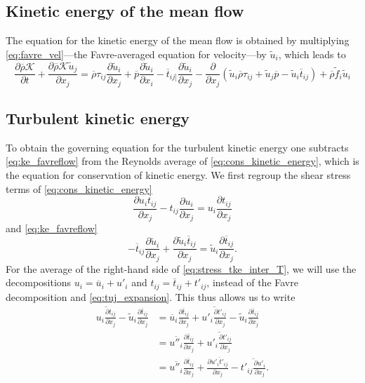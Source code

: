 \documentclass[oneside,a4paper,11pt]{report}
\newcommand{\rhoavg}{\overline{\rho}}
\newcommand{\pavg}{\overline{p}}
\newcommand{\tavg}{\overline{t}}
\newcommand{\uavg}{\overline{u}}
\newcommand{\tfluc}{t'}
\newcommand{\ufluc}{u'}
\newcommand{\rs}{\tau}          %
\newcommand{\favgf}{\widetilde{f}}
\newcommand{\uavgf}{\widetilde{u}}
\newcommand{\uflucf}{u''}
\begin{document}
\subsection{Kinetic energy of the mean flow}
The equation for the kinetic energy of the mean flow is obtained by multiplying \cref{eq:favre_vel}---the Favre-averaged equation for velocity---by $\uavgf_i$, which leads to
\begin{equation}
\label{eq:ke_favreflow}
\frac{ \partial \rhoavg \mathcal{K} }{ \partial t} + \frac{ \partial \rhoavg \mathcal{K} \uavgf_j }{ \partial x_j} = \rhoavg \rs_{ij} \frac{ \partial \uavgf_i }{ \partial x_j } + \pavg \frac{ \partial \uavgf_i }{ \partial x_i } - \tavg_{ij]} \frac{ \partial \uavgf_i }{ \partial x_j } - \frac{\partial}{\partial x_j} \left ( \uavgf_i \rhoavg \rs_{ij} + \uavgf_j \pavg - \uavgf_i \tavg_{ij} \right ) + \rhoavg \favgf_i \uavgf_i
\end{equation}

\subsection{Turbulent kinetic energy}
To obtain the governing equation for the turbulent kinetic energy one subtracts \cref{eq:ke_favreflow} from the Reynolds average of \cref{eq:cons_kinetic_energy}, which is the equation for conservation of kinetic energy. We first regroup the shear stress terms of \cref{eq:cons_kinetic_energy}  
\begin{equation}
\label{eq:stress_tke_inter_T}
     \frac{\partial u_i t_{ij} }{\partial x_j} - t_{ij} \frac{\partial u_i}{\partial x_j} =  u_i \frac{\partial t_{ij} }{\partial x_j}
\end{equation}
and \cref{eq:ke_favreflow}
\begin{equation}
     -\tavg_{ij} \frac{ \partial \uavgf_i}{\partial x_j} + \frac{ \partial \uavgf_i \tavg_{ij} }{\partial x_j} = \uavgf_i \frac{ \partial \tavg_{ij} }{\partial x_j}.
\end{equation}
For the average of the right-hand side of \cref{eq:stress_tke_inter_T}, we will use the decompositions $u_i = \uavg_i + \ufluc_i$ and $t_{ij} = \tavg_{ij} + \tfluc_{ij}$, instead of the Favre decomposition and \cref{eq:tuj_expansion}. This thus allows us to write 
\begin{align}
\overline{ u_i \frac{\partial t_{ij} }{\partial x_j} } - \uavgf_i \frac{ \partial \tavg_{ij} }{\partial x_j} & = \uavg_i \frac{\partial \tavg_{ij} }{\partial x_j} + \overline{ \ufluc_i \frac{\partial \tfluc_{ij}}{\partial x_j} } - \uavgf_i \frac{\partial \tavg_{ij} }{\partial x_j} \nonumber \\
& = \overline{ \uflucf_i } \frac{\partial \tavg_{ij} }{\partial x_j} + \overline{ \ufluc_i \frac{\partial \tfluc_{ij} }{\partial x_j} } \nonumber \\
& = \overline{ \uflucf_i } \frac{\partial \tavg_{ij} }{\partial x_j} + \frac{\partial \overline{ \ufluc_i \tfluc_{ij} }}{\partial x_j} - \overline{ \tfluc_{ij} \frac{\partial \ufluc_i}{\partial x_j} }.
\end{align} 
\end{document}
